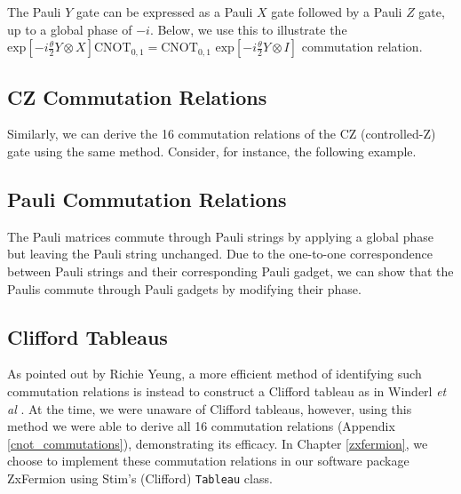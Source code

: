 
The Pauli $Y$ gate can be expressed as a Pauli $X$ gate followed by a Pauli $Z$ gate, up to a global phase of $-i$. Below, we use this to illustrate the $\text{exp} \left[ - i\frac{\theta}{2} Y \otimes X \right] \text{CNOT}_{0, 1} = \text{CNOT}_{0, 1} \,\, \text{exp} \left[ - i\frac{\theta}{2} Y \otimes I \right]$ commutation relation.



\subsection{CZ Commutation Relations}

Similarly, we can derive the 16 commutation relations of the CZ (controlled-Z) gate using the same method. Consider, for instance, the following example.


\subsection{Pauli Commutation Relations}

The Pauli matrices commute through Pauli strings by applying a global phase but leaving the Pauli string unchanged. Due to the one-to-one correspondence between Pauli strings and their corresponding Pauli gadget, we can show that the Paulis commute through Pauli gadgets by modifying their phase.


\subsection{Clifford Tableaus}

As pointed out by Richie Yeung, a more efficient method of identifying such commutation relations is instead to construct a Clifford tableau as in Winderl \textit{et al} \cite{Yeung2023}. At the time, we were unaware of Clifford tableaus, however, using this method we were able to derive all 16 commutation relations (Appendix \ref{cnot_commutations}), demonstrating its efficacy. In Chapter \ref{zxfermion}, we choose to implement these commutation relations in our software package ZxFermion using Stim's (Clifford) \lstinline{Tableau} class.

